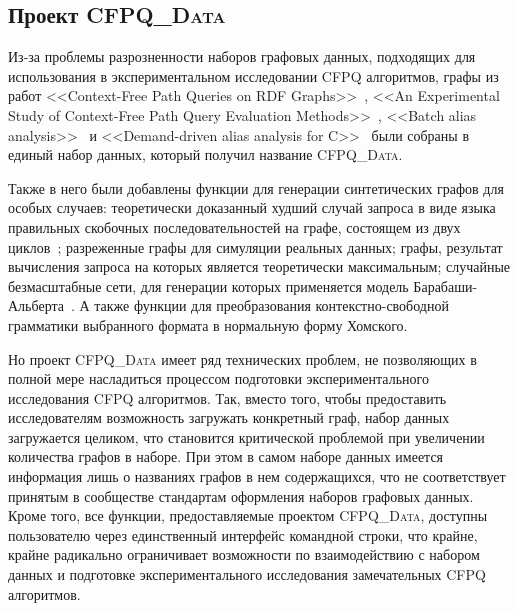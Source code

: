 \subsection{Проект \textsc{CFPQ\_Data}}

Из-за проблемы разрозненности наборов графовых данных, подходящих для использования в экспериментальном исследовании CFPQ алгоритмов, графы из работ <<Context-Free Path Queries on RDF Graphs>>~\cite{CFPQORDFG}, <<An Experimental Study of Context-Free Path Query Evaluation Methods>>~\cite{ANESOFCFPQEM}, <<Batch alias analysis>>~\cite{BAA} и <<Demand-driven alias analysis for C>>~\cite{DDAAFORC} были собраны в единый набор данных, который получил название \textsc{CFPQ\_Data}.

Также в него были добавлены функции для генерации синтетических графов для особых случаев: теоретически доказанный худший случай запроса в виде языка правильных скобочных последовательностей на графе, состоящем из двух циклов~\cite{QFORPINGUCFPQ}; разреженные графы для симуляции реальных данных; графы, результат вычисления запроса на которых является теоретически максимальным; случайные безмасштабные сети, для генерации которых применяется модель Барабаши-Альберта~\cite{SMOFCN}.
А также функции для преобразования кон\-текстно-свобод\-ной грамматики выбранного формата в нормальную форму Хомского.

Но проект \textsc{CFPQ\_Data} имеет ряд технических проблем, не позволяющих в полной мере насладиться процессом подготовки экспериментального исследования CFPQ алгоритмов.
Так, вместо того, чтобы предоставить исследователям возможность загружать конкретный граф, набор данных загружается целиком, что становится критической проблемой при увеличении количества графов в наборе.
При этом в самом наборе данных имеется информация лишь о названиях графов в нем содержащихся, что не соответствует принятым в сообществе стандартам оформления наборов графовых данных.
Кроме того, все функции, предоставляемые проектом \textsc{CFPQ\_Data}, доступны пользователю через единственный интерфейс командной строки, что крайне, крайне радикально ограничивает возможности по взаимодействию с набором данных и подготовке экспериментального исследования замечательных CFPQ алгоритмов.
